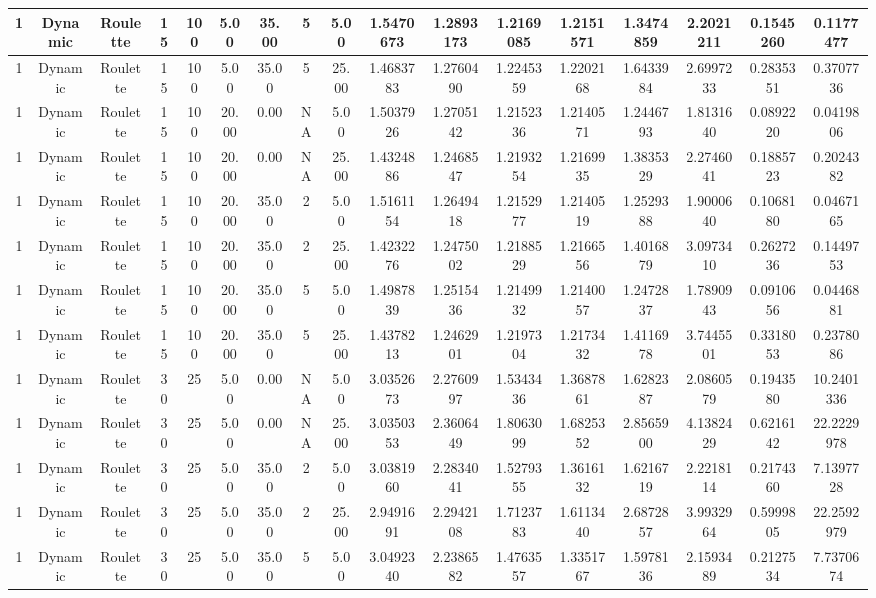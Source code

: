 \documentclass[a4paper]{article}
\begin{document}
\begin{center}
\begin{tabular}{ | c | c | c | c | c | c | c | c | c | c | c | c | c | c | c | c | c | }
		\hline
		1	&	Dynamic	&	Roulette	&	15	&	100	&	5.00	&	35.00	&	5	&	5.00	&	1.5470673	&	1.2893173	&	1.2169085	&	1.2151571	&	1.3474859	&	2.2021211	&	0.1545260	&	0.1177477 \\
		\hline
		1	&	Dynamic	&	Roulette	&	15	&	100	&	5.00	&	35.00	&	5	&	25.00	&	1.4683783	&	1.2760490	&	1.2245359	&	1.2202168	&	1.6433984	&	2.6997233	&	0.2835351	&	0.3707736 \\
		\hline
		1	&	Dynamic	&	Roulette	&	15	&	100	&	20.00	&	0.00	&	NA	&	5.00	&	1.5037926	&	1.2705142	&	1.2152336	&	1.2140571	&	1.2446793	&	1.8131640	&	0.0892220	&	0.0419806 \\
		\hline
		1	&	Dynamic	&	Roulette	&	15	&	100	&	20.00	&	0.00	&	NA	&	25.00	&	1.4324886	&	1.2468547	&	1.2193254	&	1.2169935	&	1.3835329	&	2.2746041	&	0.1885723	&	0.2024382 \\
		\hline
		1	&	Dynamic	&	Roulette	&	15	&	100	&	20.00	&	35.00	&	2	&	5.00	&	1.5161154	&	1.2649418	&	1.2152977	&	1.2140519	&	1.2529388	&	1.9000640	&	0.1068180	&	0.0467165 \\
		\hline
		1	&	Dynamic	&	Roulette	&	15	&	100	&	20.00	&	35.00	&	2	&	25.00	&	1.4232276	&	1.2475002	&	1.2188529	&	1.2166556	&	1.4016879	&	3.0973410	&	0.2627236	&	0.1449753 \\
		\hline
		1	&	Dynamic	&	Roulette	&	15	&	100	&	20.00	&	35.00	&	5	&	5.00	&	1.4987839	&	1.2515436	&	1.2149932	&	1.2140057	&	1.2472837	&	1.7890943	&	0.0910656	&	0.0446881 \\
		\hline
		1	&	Dynamic	&	Roulette	&	15	&	100	&	20.00	&	35.00	&	5	&	25.00	&	1.4378213	&	1.2462901	&	1.2197304	&	1.2173432	&	1.4116978	&	3.7445501	&	0.3318053	&	0.2378086 \\
		\hline
		1	&	Dynamic	&	Roulette	&	30	&	25	&	5.00	&	0.00	&	NA	&	5.00	&	3.0352673	&	2.2760997	&	1.5343436	&	1.3687861	&	1.6282387	&	2.0860579	&	0.1943580	&	10.2401336 \\
		\hline
		1	&	Dynamic	&	Roulette	&	30	&	25	&	5.00	&	0.00	&	NA	&	25.00	&	3.0350353	&	2.3606449	&	1.8063099	&	1.6825352	&	2.8565900	&	4.1382429	&	0.6216142	&	22.2229978 \\
		\hline
		1	&	Dynamic	&	Roulette	&	30	&	25	&	5.00	&	35.00	&	2	&	5.00	&	3.0381960	&	2.2834041	&	1.5279355	&	1.3616132	&	1.6216719	&	2.2218114	&	0.2174360	&	7.1397728 \\
		\hline
		1	&	Dynamic	&	Roulette	&	30	&	25	&	5.00	&	35.00	&	2	&	25.00	&	2.9491691	&	2.2942108	&	1.7123783	&	1.6113440	&	2.6872857	&	3.9932964	&	0.5999805	&	22.2592979 \\
		\hline
		1	&	Dynamic	&	Roulette	&	30	&	25	&	5.00	&	35.00	&	5	&	5.00	&	3.0492340	&	2.2386582	&	1.4763557	&	1.3351767	&	1.5978136	&	2.1593489	&	0.2127534	&	7.7370674 \\

\end{tabular}
\end{center}
\end{document}
